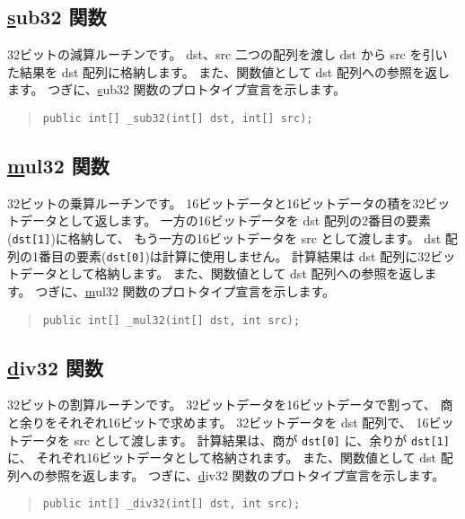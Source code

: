\subsection{\ul sub32 関数}

32ビットの減算ルーチンです。
dst、src 二つの配列を渡し dst から src を引いた結果を dst 配列に格納します。
また、関数値として dst 配列への参照を返します。
つぎに、\ul sub32 関数のプロトタイプ宣言を示します。

\begin{quote}
\begin{verbatim}
public int[] _sub32(int[] dst, int[] src);
\end{verbatim}
\end{quote}

\subsection{\ul mul32 関数}

32ビットの乗算ルーチンです。
16ビットデータと16ビットデータの積を32ビットデータとして返します。
一方の16ビットデータを dst 配列の2番目の要素(\verb/dst[1]/)に格納して、
もう一方の16ビットデータを src として渡します。
dst 配列の1番目の要素(\verb/dst[0]/)は計算に使用しません。
計算結果は dst 配列に32ビットデータとして格納します。
また、関数値として dst 配列への参照を返します。
つぎに、\ul mul32 関数のプロトタイプ宣言を示します。

\begin{quote}
\begin{verbatim}
public int[] _mul32(int[] dst, int src);
\end{verbatim}
\end{quote}

\subsection{\ul div32 関数}

32ビットの割算ルーチンです。
32ビットデータを16ビットデータで割って、
商と余りをそれぞれ16ビットで求めます。
32ビットデータを dst 配列で、
16ビットデータを src として渡します。
計算結果は、商が \verb/dst[0]/ に、余りが \verb/dst[1]/ に、
それぞれ16ビットデータとして格納されます。
また、関数値として dst 配列への参照を返します。
つぎに、\ul div32 関数のプロトタイプ宣言を示します。

\begin{quote}
\begin{verbatim}
public int[] _div32(int[] dst, int src);
\end{verbatim}
\end{quote}


